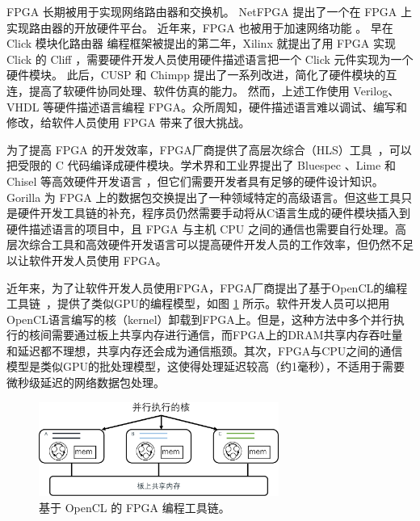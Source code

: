 FPGA 长期被用于实现网络路由器和交换机。
NetFPGA \cite{lockwood2007netfpga} 提出了一个在 FPGA 上实现路由器的开放硬件平台。
近年来，FPGA 也被用于加速网络功能 \cite {rubow2010chimpp,lavasani2012compiling}。
早在 Click 模块化路由器 \cite{kohler2000click} 编程框架被提出的第二年，Xilinx 就提出了用 FPGA 实现 Click 的 Cliff \cite{kulkarni2004mapping}，需要硬件开发人员使用硬件描述语言把一个 Click 元件实现为一个硬件模块。
此后，CUSP \cite{schelle2005cusp} 和 Chimpp \cite {rubow2010chimpp} 提出了一系列改进，简化了硬件模块的互连，提高了软硬件协同处理、软件仿真的能力。
然而，上述工作使用 Verilog、VHDL 等硬件描述语言编程 FPGA。众所周知，硬件描述语言难以调试、编写和修改，给软件人员使用 FPGA 带来了很大挑战。

为了提高 FPGA 的开发效率，FPGA厂商提供了高层次综合（HLS）工具~\cite{vivado,intel-hls}，可以把受限的 C 代码编译成硬件模块。学术界和工业界提出了 Bluespec \cite{bluespec}、Lime \cite{auerbach2010lime} 和 Chisel \cite{bachrach2012chisel} 等高效硬件开发语言 \cite{bacon2013fpga,singh2011implementing,wester2015transformation}，但它们需要开发者具有足够的硬件设计知识。Gorilla \cite {lavasani2012compiling} 为 FPGA 上的数据包交换提出了一种领域特定的高级语言。但这些工具只是硬件开发工具链的补充，程序员仍然需要手动将从C语言生成的硬件模块插入到硬件描述语言的项目中，且 FPGA 与主机 CPU 之间的通信也需要自行处理。高层次综合工具和高效硬件开发语言可以提高硬件开发人员的工作效率，但仍然不足以让软件开发人员使用 FPGA。

近年来，为了让软件开发人员使用FPGA，FPGA厂商提出了基于OpenCL的编程工具链~\cite{aoc,sdaccel}，提供了类似GPU的编程模型，如图 \ref{intro:fig:opencl} 所示。软件开发人员可以把用OpenCL语言编写的核（kernel）卸载到FPGA上。但是，这种方法中多个并行执行的核间需要通过板上共享内存进行通信，而FPGA上的DRAM共享内存吞吐量和延迟都不理想，共享内存还会成为通信瓶颈。其次，FPGA与CPU之间的通信模型是类似GPU的批处理模型，这使得处理延迟较高（约1毫秒），不适用于需要微秒级延迟的网络数据包处理。


\begin{figure}[htbp]
	\centering
	\includegraphics[width=0.7\textwidth]{figures/opencl.pdf}
	\caption{基于 OpenCL 的 FPGA 编程工具链。}
	\label{intro:fig:opencl}
\end{figure}


